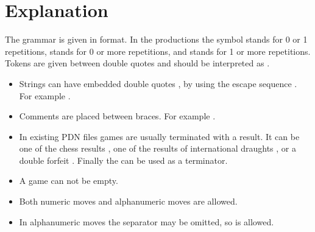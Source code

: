 \documentclass[letterpaper,10pt,english]{sphinxmanual}
\begin{document}
\section{Explanation}
\label{\detokenize{grammar:explanation}}
\sphinxAtStartPar
The grammar is given in  format.
In the productions the symbol  stands for 0 or 1 repetitions, \sphinxcode{\sphinxupquote{*}} stands for 0 or more repetitions,
and \sphinxcode{\sphinxupquote{+}} stands for 1 or more repetitions. Tokens are given between double quotes and should be interpreted
as .
\begin{itemize}
\item {} 
\sphinxAtStartPar
Strings can have embedded double quotes , by using the escape sequence . For example .

\item {} 
\sphinxAtStartPar
Comments are placed between braces. For example .

\item {} 
\sphinxAtStartPar
In existing PDN files games are usually terminated with a result. It can be one of the chess results
, one of the results of international draughts , or a
double forfeit . Finally the \sphinxcode{\sphinxupquote{*}} can be used as a terminator.

\item {} 
\sphinxAtStartPar
A game can not be empty.

\item {} 
\sphinxAtStartPar
Both numeric moves  and alpha\sphinxhyphen{}numeric moves  are allowed.

\item {} 
\sphinxAtStartPar
In alpha\sphinxhyphen{}numeric moves the separator may be omitted, so  is allowed.


\end{itemize}
\end{document}
